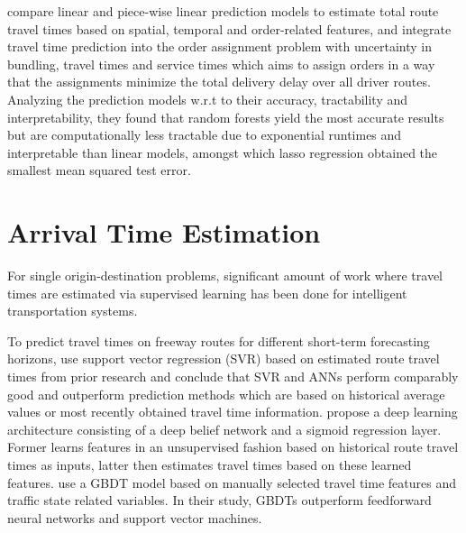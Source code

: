 \cite{Liu2018_LM_PLM} compare linear and piece-wise linear prediction models to estimate total route travel times based on spatial, temporal and order-related features, and integrate travel time prediction into the order assignment problem with uncertainty in bundling, travel times and service times which aims to assign orders in a way that the assignments minimize the total delivery delay over all driver routes. Analyzing the prediction models w.r.t to their accuracy, tractability and interpretability, they found that random forests yield the most accurate results but are computationally less tractable due to exponential runtimes and interpretable than linear models, amongst which lasso regression obtained the smallest mean squared test error.


\section{Arrival Time Estimation}





For single origin-destination problems, significant amount of work where travel times are estimated via supervised learning has been done for intelligent transportation systems. 

To predict travel times on freeway routes for different short-term forecasting horizons, \cite{Vanajakshi2007} use support vector regression (SVR) based on estimated route travel times from prior research and conclude that SVR and ANNs perform comparably good and outperform prediction methods which are based on historical average values or most recently obtained travel time information. 
\cite{Siripanpornchana2016_AnnWithDbnFS} propose a deep learning architecture consisting of a deep belief network and a sigmoid regression layer. Former learns features in an unsupervised fashion based on historical route travel times as inputs, latter then estimates travel times based on these learned features. \cite{Cheng2019_GBDT} use a GBDT model based on manually selected travel time features and traffic state related variables. In their study, GBDTs outperform feedforward neural networks and support vector machines.

